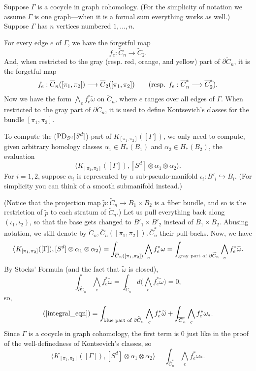 \documentclass[11pt]{article}
\theoremstyle{definition}
\theoremstyle{remark}
\def\wt#1{\widetilde{#1}}
\def\ov#1{\overline{#1}}
\def\tn#1{\textnormal{#1}}
\begin{document}
Suppose $\Gamma$ is a cocycle in graph cohomology. (For the simplicity of notation we assume $\Gamma$ is one graph---when it is a formal sum everything works as well.)
Suppose $\Gamma$ has $n$ vertices numbered $1,\ldots,n$. 

For every edge $e$ of $\Gamma$, we have the forgetful map 
$$f_e:\wt{C}_n\longrightarrow\wt{C}_2.$$
And, when restricted to the gray (resp. red, orange, and yellow) part of $\partial\wt{C}_n$, it is the forgetful map
$$f_e:\ov{C}_n([\pi_1,\pi_2])\longrightarrow\ov{C}_2([\pi_1,\pi_2]) \qquad (\tn{resp. } f_e:\ov{C}^*_n\longrightarrow\ov{C}^*_2).$$
Now we have the form $\bigwedge_{e}f_e^*\wt{\omega}$ on $\wt{C}_n$, where $e$ ranges over all edges of $\Gamma$. 
When restricted to the gray part of $\partial\wt{C}_n$, it is used to define Kontsevich's classes for the bundle $[\pi_1,\pi_2]$. 

To compute the ($\tn{PD}_{S^d}[S^d]$)-part of $K_{[\pi_1,\pi_2]}([\Gamma])$, we only need to compute, given arbitrary homology classes $\alpha_1\in H_*(B_1)$ and $\alpha_2\in H_*(B_2)$, the evaluation
$$\big\langle K_{[\pi_1,\pi_2]}([\Gamma]), [S^d]\otimes\alpha_1\otimes\alpha_2 \big\rangle.$$
For $i=1,2$, suppose $\alpha_i$ is represented by a sub-pseudo-manifold $\iota_i:B'_i\hookrightarrow B_i$. (For simplicity you can think of a smooth submanifold instead.)

(Notice that the projection map 
$\wt{p}:\wt{C}_n\to B_1\times B_2$
is a fiber bundle, and so is the restriction of $\wt{p}$ to each stratum of $\wt{C}_n$.)
Let us pull everything back along $(\iota_1,\iota_2)$, so that the base gets changed to $B'_1\times B'_2$ instead of $B_1\times B_2$. 
Abusing notation, we still denote by
$\wt{C}_n,\ov{C}_n([\pi_1,\pi_2]),\ov{C}^*_n$
their pull-backs. 
Now, we have 
\begin{equation}
\label{integral_eqn}
\big\langle K_{[\pi_1,\pi_2]}([\Gamma]), [S^d]\otimes\alpha_1\otimes\alpha_2 \big\rangle=
\int_{\ov{C}_n([\pi_1,\pi_2])}\bigwedge_{e}f_e^*{\omega}=
\int_{\tn{gray part of }\partial\wt{C}_n}\bigwedge_{e}f_e^*\wt{\omega}.
\end{equation}
By Stocks' Formula (and the fact that $\wt\omega$ is closed), 
$$\int_{\partial\wt{C}_n}\bigwedge_{e}f_e^*\wt{\omega}=\int_{\wt{C}_n}d\Big(\bigwedge_{e}f_e^*\wt{\omega}\Big)=0,$$
so, 
$$(\ref{integral_eqn})=\int_{\tn{blue part of }\partial\wt{C}_n}\bigwedge_{e}f_e^*\wt{\omega}+\int_{\ov{C}^*_n}\bigwedge_{e}f_e^*{\omega_*}.$$
Since $\Gamma$ is a cocycle in graph cohomology, the first term is 0 just like in the proof of the well-definedness of Kontsevich's classes, so
$$\big\langle K_{[\pi_1,\pi_2]}([\Gamma]), [S^d]\otimes\alpha_1\otimes\alpha_2 \big\rangle=
\int_{\ov{C}^*_n}\bigwedge_{e}f_e^*{\omega_*}.$$
\end{document}
